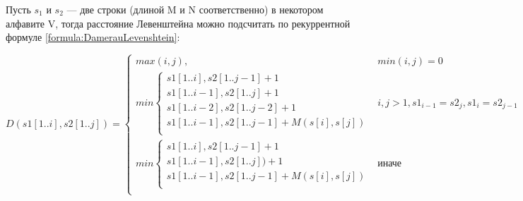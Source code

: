     Пусть $s_{1}$ и $s_{2}$ — две строки (длиной M и N соответственно) в некотором алфавите V,
    тогда расстояние Левенштейна можно подсчитать по рекуррентной формуле \ref{formula:DamerauLevenshtein}:

    \begin{equation}\label{formula:DamerauLevenshtein}
        D(s1[1..i],s2[1..j]) = \left\{ \begin{array}{ll}
            max(i, j), & \textrm{$min(i, j) = 0$}\\

            min \left\{ \begin{array}{lll}
                s1[1..i], s2[1..j-1] + 1                 \\
                s1[1..i-1], s2[1..j] + 1                 \\
                s1[1..i-2], s2[1..j-2] + 1               \\ 
                s1[1..i-1],s2[1..j-1] + M(s[i], s[j])    \\
                \end{array} \right. & \textrm{$i, j > 1, s1_{i-1} = s2_j, s1_i = s2_{j-1}$}\\

            min \left\{ \begin{array}{lll}
                s1[1..i], s2[1..j-1]+ 1                  \\
                s1[1..i-1], s2[1..j]) + 1                \\ 
                s1[1..i-1],s2[1..j-1] + M(s[i], s[j])    \\
                \end{array} \right. & \textrm{иначе}\\
        \end{array} \right.
    \end{equation}

\newpage